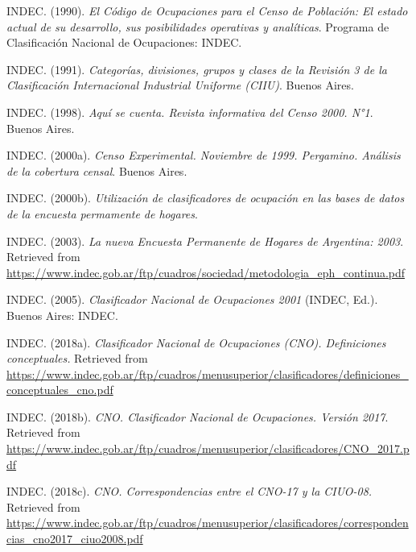 \documentclass[
]{article}
\newlength{\cslhangindent}
\newlength{\cslentryspacingunit} %
\newenvironment{CSLReferences}[2] %
 {%
  \setlength{\parindent}{0pt}
  \ifodd #1
  \let\oldpar\par
  \def\par{\hangindent=\cslhangindent\oldpar}
  \fi
  \setlength{\parskip}{#2\cslentryspacingunit}
 }%
 {}
\begin{document}
\begin{CSLReferences}{1}{0}
\leavevmode{}%
INDEC. (1990). \emph{El {Código} de {Ocupaciones} para el {Censo} de {Población}: El estado actual de su desarrollo, sus posibilidades operativas y analíticas}. Programa de Clasificación Nacional de Ocupaciones: INDEC.

\leavevmode{}%
INDEC. (1991). \emph{Categorías, divisiones, grupos y clases de la {Revisión} 3 de la {Clasificación} {Internacional} {Industrial} {Uniforme} ({CIIU})}. Buenos Aires.

\leavevmode{}%
INDEC. (1998). \emph{Aquí se cuenta. {Revista} informativa del {Censo} 2000. {N}°1}. Buenos Aires.

\leavevmode{}%
INDEC. (2000a). \emph{Censo {Experimental}. {Noviembre} de 1999. {Pergamino}. {Análisis} de la cobertura censal}. Buenos Aires.

\leavevmode{}%
INDEC. (2000b). \emph{Utilización de clasificadores de ocupación en las bases de datos de la encuesta permamente de hogares}.

\leavevmode{}%
INDEC. (2003). \emph{La nueva {Encuesta} {Permanente} de {Hogares} de {Argentina}: 2003}. Retrieved from \url{https://www.indec.gob.ar/ftp/cuadros/sociedad/metodologia_eph_continua.pdf}

\leavevmode{}%
INDEC. (2005). \emph{Clasificador {Nacional} de {Ocupaciones} 2001} (INDEC, Ed.). Buenos Aires: INDEC.

\leavevmode{}%
INDEC. (2018a). \emph{Clasificador {Nacional} de {Ocupaciones} ({CNO}). {Definiciones} conceptuales.} Retrieved from \url{https://www.indec.gob.ar/ftp/cuadros/menusuperior/clasificadores/definiciones_conceptuales_cno.pdf}

\leavevmode{}%
INDEC. (2018b). \emph{{CNO}. {Clasificador} {Nacional} de {Ocupaciones}. {Versión} 2017}. Retrieved from \url{https://www.indec.gob.ar/ftp/cuadros/menusuperior/clasificadores/CNO_2017.pdf}

\leavevmode{}%
INDEC. (2018c). \emph{{CNO}. {Correspondencias} entre el {CNO}-17 y la {CIUO}-08.} Retrieved from \url{https://www.indec.gob.ar/ftp/cuadros/menusuperior/clasificadores/correspondencias_cno2017_ciuo2008.pdf}


\end{CSLReferences}
\end{document}
